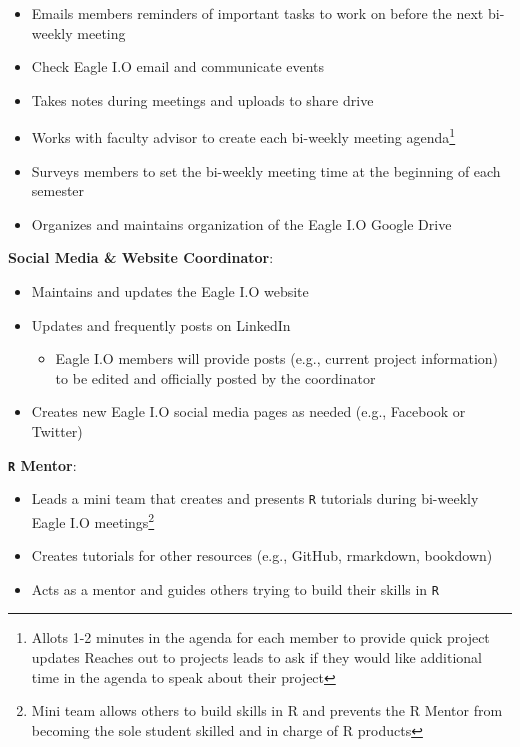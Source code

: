 \documentclass[
]{book}
\providecommand{\tightlist}{%
  \setlength{\itemsep}{0pt}\setlength{\parskip}{0pt}}
\begin{document}
\begin{itemize}
\tightlist
\item
  Emails members reminders of important tasks to work on before the next bi-weekly meeting
\item
  Check Eagle I.O email and communicate events
\item
  Takes notes during meetings and uploads to share drive\\
\item
  Works with faculty advisor to create each bi-weekly meeting agenda\footnote{Allots 1-2 minutes in the agenda for each member to provide quick project updates Reaches out to projects leads to ask if they would like additional time in the agenda to speak about their project}
\item
  Surveys members to set the bi-weekly meeting time at the beginning of each semester
\item
  Organizes and maintains organization of the Eagle I.O Google Drive
\end{itemize}

\textbf{Social Media \& Website Coordinator}:

\begin{itemize}
\tightlist
\item
  Maintains and updates the Eagle I.O website
\item
  Updates and frequently posts on LinkedIn

  \begin{itemize}
  \tightlist
  \item
    Eagle I.O members will provide posts (e.g., current project information) to be edited and officially posted by the coordinator
  \end{itemize}
\item
  Creates new Eagle I.O social media pages as needed (e.g., Facebook or Twitter)
\end{itemize}

\textbf{\texttt{R} Mentor}:

\begin{itemize}
\tightlist
\item
  Leads a mini team that creates and presents \texttt{R} tutorials during bi-weekly Eagle I.O meetings\footnote{Mini team allows others to build skills in R and prevents the R Mentor from becoming the sole student skilled and in charge of R products}
\item
  Creates tutorials for other resources (e.g., GitHub, rmarkdown, bookdown)\\
\item
  Acts as a mentor and guides others trying to build their skills in \texttt{R}
\end{itemize}
\end{document}
